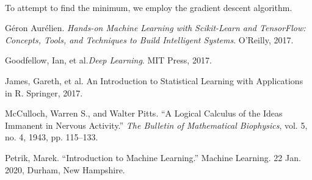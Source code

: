 \documentclass[12pt,letterpaper]{article}
\begin{document}
\paragraph*{}To attempt to find the minimum, we employ the gradient descent algorithm. 





\begin{thebibliography}{9}


Géron Aurélien. \textit{Hands-on Machine Learning with Scikit-Learn and TensorFlow: Concepts, Tools, and Techniques to Build Intelligent Systems}. O'Reilly, 2017.

Goodfellow, Ian, et al.\textit{Deep Learning}. MIT Press, 2017.

James, Gareth, et al. {An Introduction to Statistical Learning with Applications in R}. Springer, 2017.

McCulloch, Warren S., and Walter Pitts. “A Logical Calculus of the Ideas Immanent in Nervous Activity.” \textit{The Bulletin of Mathematical Biophysics}, vol. 5, no. 4, 1943, pp. 115–133.

Petrik, Marek. “Introduction to Machine Learning.” Machine Learning. 22 Jan. 2020, Durham, New Hampshire.

\end{thebibliography}

\end{document}
